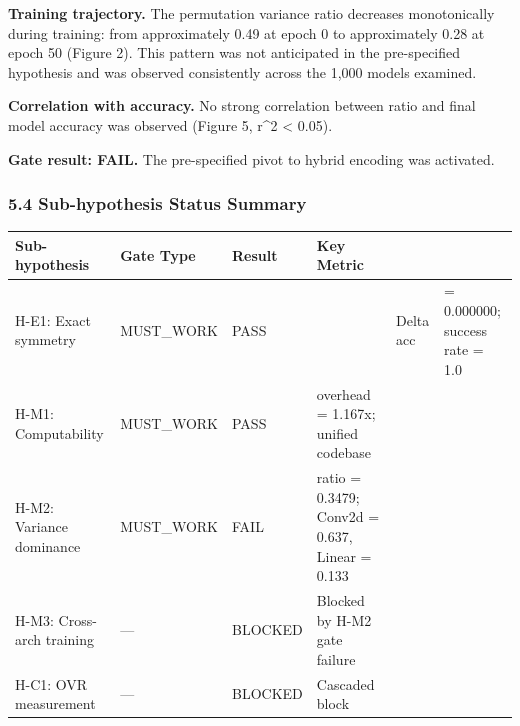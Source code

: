 \textbf{Training trajectory.} The permutation variance ratio decreases monotonically during training: from approximately 0.49 at epoch 0 to approximately 0.28 at epoch 50 (Figure 2). This pattern was not anticipated in the pre-specified hypothesis and was observed consistently across the 1,000 models examined.

\textbf{Correlation with accuracy.} No strong correlation between ratio and final model accuracy was observed (Figure 5, r^2 < 0.05).

\textbf{Gate result: FAIL.} The pre-specified pivot to hybrid encoding was activated.

\subsubsection{5.4 Sub-hypothesis Status Summary}

\begin{table}[htbp]
\centering
\begin{tabular}{llllll}
\toprule
Sub-hypothesis & Gate Type & Result & Key Metric &  &  \\
\midrule
H-E1: Exact symmetry & MUST_WORK & PASS &  & Delta acc & = 0.000000; success rate = 1.0 \\
H-M1: Computability & MUST_WORK & PASS & overhead = 1.167x; unified codebase &  &  \\
H-M2: Variance dominance & MUST_WORK & FAIL & ratio = 0.3479; Conv2d = 0.637, Linear = 0.133 &  &  \\
H-M3: Cross-arch training & — & BLOCKED & Blocked by H-M2 gate failure &  &  \\
H-C1: OVR measurement & — & BLOCKED & Cascaded block &  &  \\
\bottomrule
\end{tabular}
\end{table}

